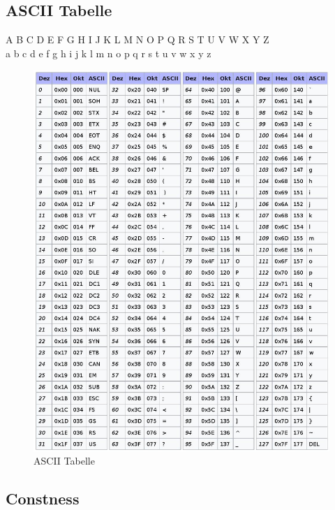 \clearpage

\subsection{ASCII Tabelle}
A B C D E F G H I J K L M N O P Q R S T U V W X Y Z \\
a b c d e f g h i j k l m n o p q r s t u v w x y z
\begin{figure}[h!]
	\centering
	\includegraphics[width=0.9\linewidth]{images/ascii_table}
	\caption{ASCII Tabelle}
	\label{fig:asciitable}
\end{figure}

\clearpage

\subsection{Constness}
